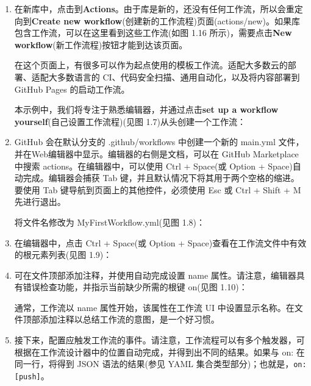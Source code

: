 \begin{enumerate}
\item 
在新库中，点击到\textbf{Actions}。由于库是新的，还没有任何工作流，所以会重定向到\textbf{Create new workflow}(创建新的工作流程)页面(actions/new)。如果库包含工作流，可以在这里看到这些工作流(如图 1.16 所示)，需要点击\textbf{New workflow}(新工作流程)按钮才能到达该页面。

在这个页面上，有很多可以作为起点使用的模板工作流。适配大多数云的部署、适配大多数语言的 CI、代码安全扫描、通用自动化，以及将内容部署到 GitHub Pages 的启动工作流。

本示例中，我们将专注于熟悉编辑器，并通过点击\textbf{set up a workflow yourself}(自己设置工作流程)(见图 1.7)从头创建一个工作流：


\item 
GitHub 会在默认分支的 .github/workflows 中创建一个新的 main.yml 文件，并在Web编辑器中显示。编辑器的右侧是文档，可以在 GitHub Marketplace 中搜索 actions。在编辑器中，可以使用 Ctrl + Space(或 Option + Space)自动完成。编辑器会捕获 Tab 键，并且默认情况下将其用于两个空格的缩进。要使用 Tab 键导航到页面上的其他控件，必须使用 Esc 或 Ctrl + Shift + M 先进行退出。

将文件名修改为 MyFirstWorkflow.yml(见图 1.8)：


\item 
在编辑器中，点击 Ctrl + Space(或 Option + Space)查看在工作流文件中有效的根元素列表(见图 1.9)：


\item 
可在文件顶部添加注释，并使用自动完成设置 name 属性。请注意，编辑器具有错误检查功能，并指示当前缺少所需的根键 on(见图 1.10)：


通常，工作流以 name 属性开始，该属性在工作流 UI 中设置显示名称。在文件顶部添加注释以总结工作流的意图，是一个好习惯。

\item 
接下来，配置应触发工作流的事件。请注意，工作流程可以有多个触发器，可根据在工作流设计器中的位置自动完成，并得到出不同的结果。如果与 on: 在同一行，将得到 JSON 语法的结果(参见 YAML 集合类型部分)；也就是，\verb|on: [push]|。


\end{enumerate}

